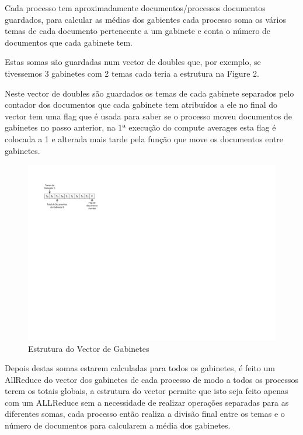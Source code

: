 \documentclass[times, 10pt,twocolumn]{article}
\begin{document}
Cada processo tem aproximadamente documentos/processos documentos guardados, para calcular as médias dos gabientes cada processo soma os vários temas de cada documento pertencente a um gabinete e conta o número de documentos que cada gabinete tem.

Estas somas são guardadas num vector de doubles que, por exemplo, se tivessemos 3 gabinetes com 2 temas cada teria a estrutura na Figure 2. 

Neste vector de doubles são guardados os temas de cada gabinete separados pelo contador dos documentos que cada gabinete tem atribuídos a ele no final do vector tem uma flag que é usada para saber se o processo moveu documentos de gabinetes no passo anterior, na 1ª execução do compute averages esta flag é colocada a 1 e alterada mais tarde pela função que move os documentos entre gabinetes.

\begin{figure}
\includegraphics[width=\columnwidth]{VectorGabinete.pdf}
\caption{Estrutura do Vector de Gabinetes}
\end{figure}

Depois destas somas estarem calculadas para todos os gabinetes, é feito um AllReduce do vector dos gabinetes de cada processo de modo a todos os processos terem os totais globais, a estrutura do vector permite que isto seja feito apenas com um ALLReduce sem a necessidade de realizar operações separadas para as diferentes somas, cada processo então realiza a divisão final entre os temas e o número de documentos para calcularem a média dos gabinetes.
\end{document}
